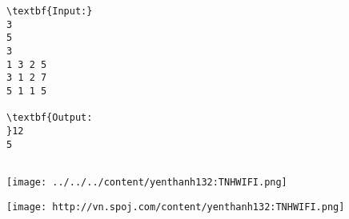 \begin{verbatim}
\textbf{Input:}
3
5
3
1 3 2 5
3 1 2 7
5 1 1 5

\textbf{Output:
}12
5


\end{verbatim}


\texttt{[image: ../../../content/yenthanh132:TNHWIFI.png]}


\texttt{[image: http://vn.spoj.com/content/yenthanh132:TNHWIFI.png]}
